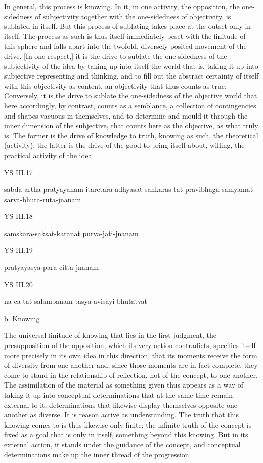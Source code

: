 In general, this process is knowing.
In it, in one activity, the opposition,
the one-sidedness of subjectivity together with
the one-sidedness of objectivity,
is sublated in itself.
But this process of sublating takes place at the outset only in itself.
The process as such is thus itself immediately beset with the finitude
of this sphere and falls apart into the twofold, diversely posited
movement of the drive.
[In one respect,] it is the drive to sublate
the one-sidedness of the subjectivity of the idea
by taking up into itself the world that is,
taking it up into subjective representing and thinking,
and to fill out the abstract certainty of itself
with this objectivity as content, an objectivity that thus counts as true.
Conversely, it is the drive to sublate
the one-sidedness of the objective world
that here accordingly, by contrast, counts as a semblance,
a collection of contingencies and shapes vacuous in themselves,
and to determine and mould it through the inner dimension of the subjective,
that counts here as the objective, as what truly is.
The former is the drive of knowledge to truth, knowing as such,
the theoretical (activity);
the latter is the drive of the good to bring itself about, willing,
the practical activity of the idea.

YS III.17

sabda-artha-pratyayanam itaretara-adhyasat sankaras tat-pravibhaga-samyamat sarva-bhuta-ruta-jnanam

YS III.18

samskara-saksat-karanat purva-jati-jnanam

YS III.19

pratyayasya para-citta-jnanam

YS III.20

na ca tat salambanam tasya-avisayi-bhutatvat

b. Knowing

The universal finitude of knowing that lies in the first judgment,
the presupposition of the opposition, which its very action contradicts,
specifies itself more precisely in its own idea in this direction,
that its moments receive the form of diversity from one another and,
since those moments are in fact complete, they come to stand in
the relationship of reflection, not of the concept, to one another.
The assimilation of the material as something given thus appears as
a way of taking it up into conceptual determinations that at the same time
remain external to it, determinations that likewise display themselves
opposite one another as diverse.
It is reason active as understanding.
The truth that this knowing comes to is thus likewise only finite;
the infinite truth of the concept is fixed as a goal that is only in itself,
something beyond this knowing.
But in its external action, it stands under the guidance of the concept,
and conceptual determinations make up the inner thread of the progression.

